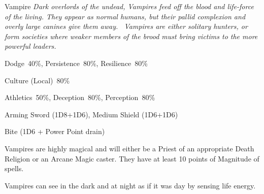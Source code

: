\begin{samepage}
\begin{monsterbox}{Vampire}
	\textit{Dark overlords of the undead, Vampires feed off the blood and life-force of the living. They appear as normal humans, but their pallid complexion and overly large canines give them away.  Vampires are either solitary hunters, or form societies where weaker members of the brood must bring victims to the more powerful leaders.}\\
	\rpghline
	\basics[%
        hitpoints  = 18, 
	majorwound = 9,
	damagemodifier = +1D6,
	powerpoints = 0 (see below),
	movementrate = 15m,
	armor = Chainmail (5AP) or Platemail (6AP) for High Vampires,
	plunderrating = 4
	]
	\rpghline%
	\stats[ %
		STR = 3D6+12 (23),
		CON = 3D6+12 (23),
		DEX = 3D6    (11),
		SIZ = 2D6+6  (13),
		INT = 2D6+6  (13),
		POW = 0      (0),
		CHA = 3D6    (11)
	]
	\rpghline
	\begin{rpg-monsteraction}[Resistances]
		Dodge~40\%, Persistence~80\%, Resilience~80\%
	\end{rpg-monsteraction}
	\begin{rpg-monsteraction}[Knowledge]
		Culture (Local)~80\%
	\end{rpg-monsteraction}
	\begin{rpg-monsteraction}[Practical]
		Athletics~50\%, Deception~80\%, Perception~80\%
	\end{rpg-monsteraction}
	\begin{rpg-monsteraction}
		Arming Sword (1D8+1D6), Medium Shield (1D6+1D6)
	\end{rpg-monsteraction}
	\begin{rpg-monsteraction}
		Bite (1D6 + Power Point drain)
	\end{rpg-monsteraction}
	\begin{rpg-monsteraction}[Magic]
		Vampires are highly magical and will either be a Priest of an appropriate Death Religion or an Arcane Magic caster. They have at least 10 points of Magnitude of spells.
	\end{rpg-monsteraction}
	\begin{rpg-monsteraction}
		Vampires can see in the dark and at night as if it was day by sensing life energy.

\end{rpg-monsteraction}
\end{monsterbox}
\end{samepage}
